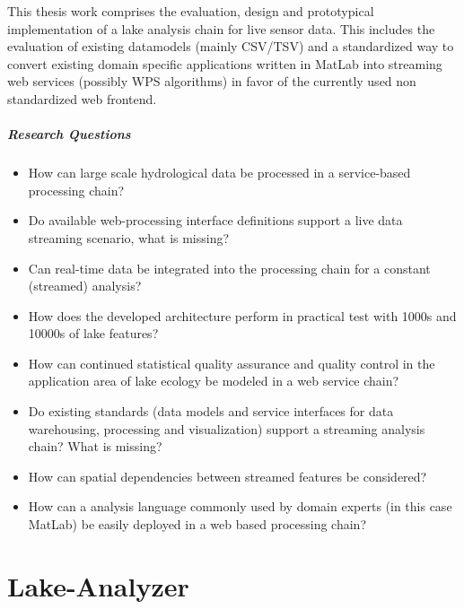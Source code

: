 	This thesis work comprises the evaluation, design and prototypical implementation of a lake analysis chain for live sensor data.
	This includes the evaluation of existing datamodels (mainly CSV/TSV) and a standardized way to convert existing domain specific applications written in MatLab into streaming web services (possibly WPS algorithms) in favor of the currently used non standardized web frontend.

	\paragraph*{Research Questions}
	\begin{itemize}
		\item How can large scale hydrological data be processed in a service-based processing chain?
		\item Do available web-processing interface definitions support a live data streaming scenario, what is missing?
		\item Can real-time data be integrated into the processing chain for a constant (streamed) analysis?
		\item How does the developed architecture perform in practical test with 1000s and 10000s of lake features?
		\item How can continued statistical quality assurance and quality control in the application area of lake ecology be modeled in a web service chain?
		\item Do existing standards (data models and service interfaces for data warehousing, processing and visualization) support a streaming analysis chain? What is missing?
		\item How can spatial dependencies between streamed features be considered?
		\item How can a analysis language commonly used by domain experts (in this case MatLab) be easily deployed in a web based processing chain?
	\end{itemize}


\chapter{Lake-Analyzer}
